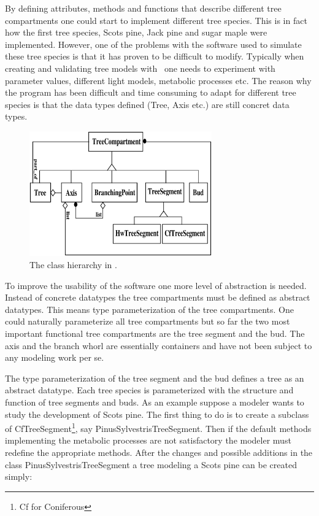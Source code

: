 By defining attributes, methods and  functions that describe different
tree   compartments  one  could start   to    implement different tree
species. This is in fact how the first tree  species, Scots pine, Jack
pine and sugar  maple were implemented.   However, one of the problems
with the software used to  simulate these tree  species is that it has
proven to   be difficult  to modify.     Typically  when creating  and
validating  tree models with \lignum\    one needs to experiment   with
parameter values, different light models, metabolic processes etc. The
reason why the program has been difficult  and time consuming to adapt
for different tree species is that  the data types defined (Tree, Axis
etc.) are still concret data types.

\begin{figure}[h]
\begin{center}
\includegraphics[width=0.7\textwidth,height=0.5\textwidth]{lignum-classes.eps}
\caption{\label{fig:1} The class hierarchy in \lignum.}
\end{center}
\end{figure}

To improve the usability of the software one more level of abstraction
is needed. Instead of concrete datatypes the tree compartments must be
defined as abstract datatypes. This means type parameterization of the
tree  compartments.   One  could   naturally  parameterize  all   tree
compartments  but so  far   the two  most important   functional  tree
compartments  are the tree  segment  and the  bud.   The axis  and the
branch whorl are  essentially containers and have  not been subject to
any modeling work per se.

The type  parameterization of the tree  segment and the  bud defines a
tree as an abstract datatype.  Each tree species is parameterized with
the structure and  function of tree segments and  buds.  As an example
suppose a modeler  wants to study the development  of Scots pine.  The
first thing to do is to create a subclass of CfTreeSegment\footnote{Cf
for Coniferous}, say  PinusSylvestrisTreeSegment.  Then if the default
methods implementing the metabolic  processes are not satisfactory the
modeler must redefine the  appropriate methods.  After the changes and
possible  additions  in the  class  PinusSylvestrisTreeSegment a  tree
modeling a Scots pine can be created simply:

